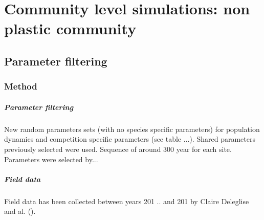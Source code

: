 
%
%

\chapter{Community level simulations: non plastic community}


\section{Parameter filtering}
\subsection{Method}

\paragraph{Parameter filtering}
New random parameters sets (with no species specific parameters) for population dynamics and competition specific parameters (see table ...). Shared parameters previously selected were used.
Sequence of around 300 year for each site. Parameters were selected by...


\paragraph{Field data}
Field data has been collected between years 201 .. and 201 by Claire Deleglise and al. ().

